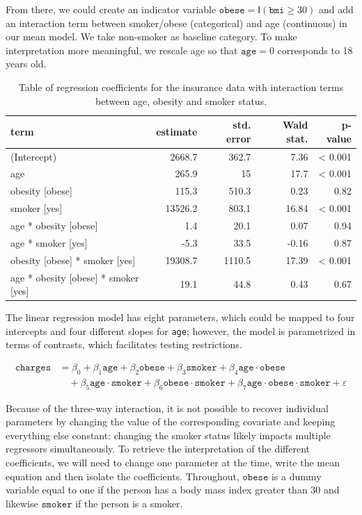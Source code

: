 \documentclass[
  11pt,
  letterpaper,
]{book}
\theoremstyle{definition}
\theoremstyle{definition}
\theoremstyle{definition}
\theoremstyle{remark}
\begin{document}
From there, we could create an indicator variable \(\texttt{obese}=\mathsf{I}(\texttt{bmi} \geq 30)\) and add an interaction term between smoker/obese (categorical) and age (continuous) in our mean model. We take non-smoker as baseline category. To make interpretation more meaningful, we rescale age so that \(\texttt{age}=0\) corresponds to 18 years old.

\begin{table}

\caption{\label{tab:coefintercharges}Table of regression coefficients for the insurance data with interaction terms between age, obesity and smoker status.}
\centering
\begin{tabular}[t]{lrrrr}
\toprule
term & estimate & std. error & Wald stat. & p-value\\
\midrule
(Intercept) & 2668.7 & 362.7 & 7.36 & < 0.001\\
age & 265.9 & 15 & 17.7 & < 0.001\\
obesity [obese] & 115.3 & 510.3 & 0.23 & 0.82\\
smoker [yes] & 13526.2 & 803.1 & 16.84 & < 0.001\\
age * obesity [obese] & 1.4 & 20.1 & 0.07 & 0.94\\
\addlinespace
age * smoker [yes] & -5.3 & 33.5 & -0.16 & 0.87\\
obesity [obese] * smoker [yes] & 19308.7 & 1110.5 & 17.39 & < 0.001\\
age * obesity [obese] * smoker [yes] & 19.1 & 44.8 & 0.43 & 0.67\\
\bottomrule
\end{tabular}
\end{table}

The linear regression model has eight parameters, which could be mapped to four intercepts and four different slopes for \texttt{age}; however, the model is parametrized in terms of contrasts, which facilitates testing restrictions.

\begin{align*}
\texttt{charges} &= \beta_{0} + \beta_{1}\texttt{age} + \beta_{2}\texttt{obese} + \beta_{3}\texttt{smoker} + 
\beta_{4}\texttt{age} \cdot \texttt{obese} \\&\quad + \beta_{5}\texttt{age} \cdot \texttt{smoker} + \beta_{6}\texttt{obese} \cdot \texttt{smoker} + \beta_{7}\texttt{age} \cdot \texttt{obese} \cdot \texttt{smoker} + \varepsilon
\end{align*}

Because of the three-way interaction, it is not possible to recover individual parameters by changing the value of the corresponding covariate and keeping everything else constant: changing the smoker status likely impacts multiple regressors simultaneously. To retrieve the interpretation of the different coefficients, we will need to change one parameter at the time, write the mean equation and then isolate the coefficients. Throughout, \(\texttt{obese}\) is a dummy variable equal to one if the person has a body mass index greater than 30 and likewise \(\texttt{smoker}\) if the person is a smoker.
\end{document}
